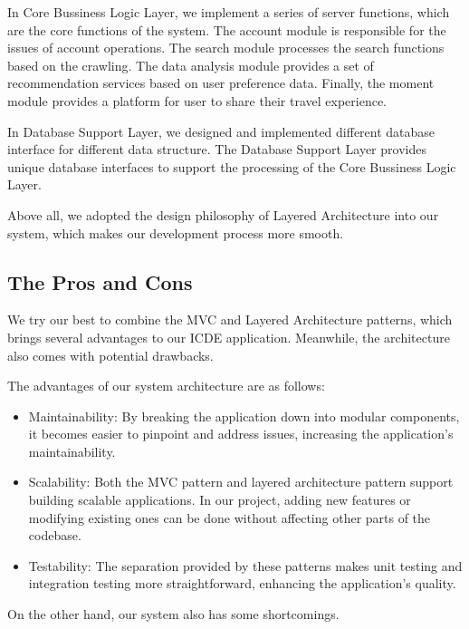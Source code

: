 \documentclass[conference]{IEEEtran}
\begin{document}
In Core Bussiness Logic Layer, we implement a series of server functions, which are the core functions of the system. The account module is responsible for the issues of account operations. The search module processes the search functions based on the crawling. The data analysis module provides a set of recommendation services based on user preference data. Finally, the moment module provides a platform for user to share their travel experience.

In Database Support Layer, we designed and implemented different database interface for different data structure. The Database Support Layer provides unique database interfaces to support the processing of the Core Bussiness Logic Layer.

Above all, we adopted the design philosophy of Layered Architecture into our system, which makes our development process more smooth.


\subsection{\textbf{The Pros and Cons}}

We try our best to combine the MVC and Layered Architecture patterns, which brings several advantages to our ICDE application. Meanwhile, the architecture also comes with potential drawbacks.

The advantages of our system architecture are as follows:

\begin{itemize}
    \item Maintainability: By breaking the application down into modular components, it becomes easier to pinpoint and address issues, increasing the application's maintainability.

    \item Scalability:  Both the MVC pattern and layered architecture pattern support building scalable applications. In our project, adding new features or modifying existing ones can be done without affecting other parts of the codebase.

    \item Testability: The separation provided by these patterns makes unit testing and integration testing more straightforward, enhancing the application's quality.

\end{itemize}

On the other hand, our system also has some shortcomings.
\end{document}
